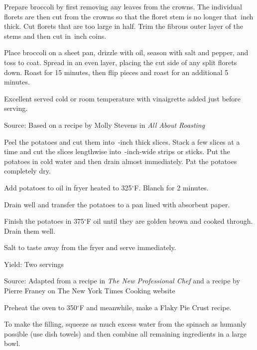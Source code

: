 \documentclass[letterpaper]{recipePMG}
\renewcommand{\deg}{$^\circ$}
\newcommand{\quarter}{\nicefrac{1}{4} \,}
\newcommand{\half}{\nicefrac{1}{2} \,}
\begin{document}
Prepare broccoli by first removing any leaves from the crowns. The individual florets are then cut from the crowns so that the floret stem is no longer that \half inch thick. Cut florets that are too large in half. Trim the fibrous outer layer of the stems and then cut in \half inch coins.

Place broccoli on a sheet pan, drizzle with oil, season with salt and pepper, and toss to coat. Spread in an even layer, placing the cut side of any split florets down.  Roast for 15 minutes, then flip pieces and roast for an additional 5 minutes.

Excellent served cold or room temperature with vinaigrette added just before serving.  

Source: Based on a recipe by Molly Stevens in \textit{All About Roasting}


\newpage
{}
\label{FrenchFriedPotatoes}

Peel the potatoes and cut them into \quarter-inch thick slices. Stack a few slices at a time and cut the slices lengthwise into \quarter-inch-wide strips or sticks.  Put the potatoes in cold water and then drain almost immediately. Pat the potatoes completely dry.

Add potatoes to oil in fryer heated to 325\deg F.  Blanch for 2 minutes.

Drain well and transfer the potatoes to a pan lined with absorbent paper.

Finish the potatoes in 375\deg F oil until they are golden brown and cooked through. Drain them well.

Salt to taste away from the fryer and serve immediately. 

Yield: Two servings

Source: Adapted from a recipe in \textit{The New Professional Chef} and a recipe by Pierre Franey on The New York Times Cooking website

\newpage
{}
\label{SpinichCheddarQuiche}


Preheat the oven to 350\deg F and meanwhile, make a Flaky Pie Crust recipe.

To make the filling, squeeze as much excess water from the spinach as humanly possible (use dish towels) and then combine all remaining ingredients in a large bowl.
\end{document}
